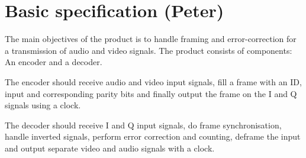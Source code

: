 \section{Basic specification (Peter)}
The main objectives of the product is to handle framing and error-correction for a transmission of audio and video signals. The product consists of components: An encoder and a decoder.

The encoder should receive audio and video input signals, fill a frame with an ID, input and corresponding parity bits and finally output the frame on the I and Q signals using a clock.

The decoder should receive I and Q input signals, do frame synchronisation, handle inverted signals, perform error correction and counting, deframe the input and output separate video and audio signals with a clock.
